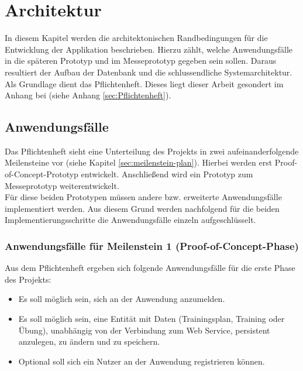 \chapter{Architektur}
\label{cha:architektur}
In diesem Kapitel werden die architektonischen Randbedingungen für die Entwicklung der Applikation beschrieben. Hierzu zählt, welche Anwendungsfälle in die späteren Prototyp und im Messeprototyp gegeben sein sollen. Daraus resultiert der Aufbau der Datenbank und die schlussendliche Systemarchitektur. Als Grundlage dient das Pflichtenheft. Dieses liegt dieser Arbeit gesondert im Anhang bei (siehe Anhang \ref{sec:Pflichtenheft}).

\section{Anwendungsfälle}
\label{sec:anwendungsfaelle}
Das Pflichtenheft sieht eine Unterteilung des Projekts in zwei aufeinanderfolgende Meilensteine vor (siehe Kapitel \ref{sec:meilenstein-plan}). Hierbei werden erst Proof-of-Concept-Prototyp entwickelt. Anschließend wird ein Prototyp zum Messeprototyp weiterentwickelt. \\
Für diese beiden Prototypen müssen andere bzw. erweiterte Anwendungsfälle implementiert werden. Aus diesem Grund werden nachfolgend für die beiden Implementierungsschritte die Anwendungsfälle einzeln aufgeschlüsselt. 
\subsection{Anwendungsfälle für Meilenstein 1 (Proof-of-Concept-Phase)}
\label{ssec:anwendungsfaelle-poc}
Aus dem Pflichtenheft ergeben sich folgende Anwendungsfälle für die erste Phase des Projekts:
\begin{itemize}
\item Es soll möglich sein, sich an der Anwendung anzumelden.
\item Es soll möglich sein, eine Entität mit Daten (Trainingsplan, Training oder Übung), unabhängig von der Verbindung zum Web Service, persistent anzulegen, zu ändern und zu speichern.
\item Optional soll sich ein Nutzer an der Anwendung registrieren können.
\end{itemize}


